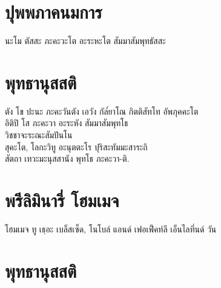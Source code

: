 \chapter*{ปุพพภาคนมการ}
\delegateSetUseNext

\begin{leader}
\end{leader}

\begin{english}
นะโม ตัสสะ ภะคะวะโต อะระหะโต สัมมาสัมพุทธัสสะ 
\end{english}

\chapter*{พุทธานุสสติ}
\delegateSetUseNext

\begin{leader}
\end{leader}


ตัง โข ปะนะ ภะคะวันตัง เอวัง กัล๎ยาโณ กิตติสัทโท อัพภุคคะโต\\
อิติปิ โส ภะคะวา อะระหัง สัมมาสัมพุทโธ\\
วิชชาจะระณะสัมปันโน\\
สุคะโต, โลกะวิทู อะนุตตะโร ปุริสะทัมมะสาระถิ\\
สัตถา เทวะมะนุสสานัง พุทโธ ภะคะวา-ติ.\\
\clearpage

\chapter{พรีลิมินารี่ โฮมเมจ}

\begin{leader}
\end{leader}

\begin{english}
โฮมเมจ ทู เธฺอะ เบล็สเซ็ด, โนโบล์ แอนด์ เฟอเฟ็คท์ลี เอ็นไลทึ่นด์ วัน
\end{english}

\chapter{พุทธานุสสติ}

\begin{leader}
\end{leader}

